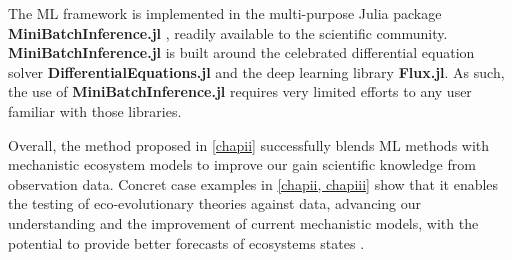 The ML framework is implemented in the multi-purpose Julia package \textbf{MiniBatchInference.jl} \citep{MiniBatchInference}, readily available to the scientific community. \textbf{MiniBatchInference.jl} is built around the celebrated differential equation solver \textbf{DifferentialEquations.jl} and the deep learning library \textbf{Flux.jl}. As such, the use of \textbf{MiniBatchInference.jl} requires very limited efforts to any user familiar with those libraries.

Overall, the method proposed in \cref{chapii} successfully blends ML methods with mechanistic ecosystem models to improve our gain scientific knowledge from observation data. Concret case examples in \cref{chapii, chapiii} show that it enables the testing of eco-evolutionary theories against data, advancing our understanding and the improvement of current mechanistic models, with the potential to provide better forecasts of ecosystems states \citep{Urban2016}.








